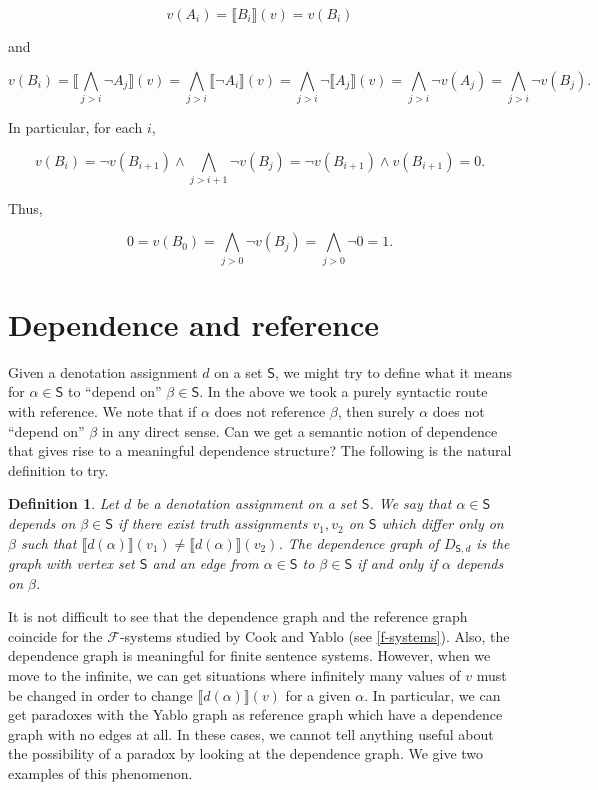 \documentclass[12pt]{kluwer}
\newtheorem{defn}{Definition}
\theoremstyle{remark}
\newcommand{\fancy}[1]{\mathcal{#1}}
\def\S{\textsf{S}}
\def\F{\fancy{F}}
\def\F{\fancy{F}}
\begin{document}
\[v(A_i) = \llbracket B_i \rrbracket(v) = v(B_i) \]

and
 
\[v(B_i) = \llbracket \bigwedge_{j > i} \neg A_j \rrbracket(v) = \bigwedge_{j > i} \llbracket \neg A_i \rrbracket(v) = \bigwedge_{j > i} \neg \llbracket A_j \rrbracket(v) = \bigwedge_{j > i} \neg v(A_j) = \bigwedge_{j > i} \neg v(B_j).\]
 
In particular, for each $i$,
 
\[v(B_i) = \neg v(B_{i+ 1}) \wedge \bigwedge_{j > i + 1} \neg v(B_j) = \neg v(B_{i + 1}) \wedge v(B_{i + 1}) = 0.\]
 
Thus, 

\[0 = v(B_0) = \bigwedge_{j > 0} \neg v(B_j)= \bigwedge_{j > 0} \neg 0 = 1.\]


\section{Dependence and reference}
\label{dependence}

Given a denotation assignment $d$ on a set $\S$, we might try to define what it means for $\alpha \in \S$ to ``depend on'' $\beta \in \S$.  In the above we took a purely syntactic route with reference.  We note that if $\alpha$ does not reference $\beta$, then surely $\alpha$ does not ``depend on'' $\beta$ in any direct sense.  Can we get a semantic notion of dependence that gives rise to a meaningful dependence structure?  The following is the natural definition to try.

\begin{defn}
Let $d$ be a denotation assignment on a set $\S$.  We say that $\alpha \in \S$ \emph{depends on} $\beta \in \S$ if there exist truth assignments $v_1, v_2$ on $\S$ which differ only on $\beta$ such that $\llbracket d(\alpha) \rrbracket(v_1) \neq \llbracket d(\alpha) \rrbracket(v_2)$.  The \emph{dependence graph} of $D_{\S, d}$ is the graph with vertex set $\S$ and an edge from $\alpha \in \S$ to $\beta \in \S$ if and only if $\alpha$ depends on $\beta$.
\end{defn}

It is not difficult to see that the dependence graph and the reference graph coincide for the $\F$-systems studied by Cook and Yablo (see \autoref{f-systems}).  Also, the dependence graph is meaningful for finite sentence systems.  However, when we move to the infinite, we can get situations where infinitely many values of $v$ must be changed in order to change  $\llbracket d(\alpha) \rrbracket(v)$ for a given $\alpha$.  In particular, we can get paradoxes with the Yablo graph as reference graph which have a dependence graph with no edges at all.  In these cases, we cannot tell anything useful about the possibility of a paradox by looking at the dependence graph.  We give two examples of this phenomenon.
\end{document}
